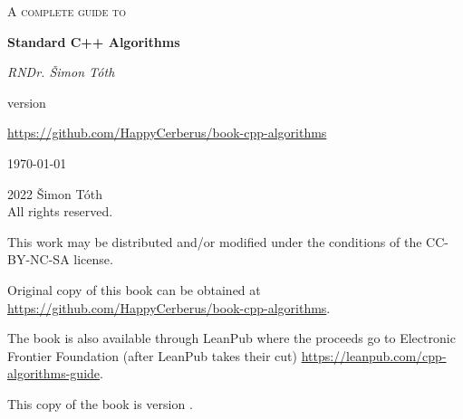 \begin{titlepage}
	\centering
	\vspace{2cm}
	{\scshape\huge A complete guide to\par}
	\vspace{1.5cm}
	{\huge\bfseries Standard C++ Algorithms\par}
	\vspace{2cm}
	{\Large\itshape RNDr. Šimon Tóth\par}
	\vfill
	version \version\par
	\href{https://github.com/HappyCerberus/book-cpp-algorithms}{https://github.com/HappyCerberus/book-cpp-algorithms}

	\vfill

	{\large \today\par}
\end{titlepage}

\pagestyle{empty}
\begingroup
\footnotesize
\parindent 0pt
\parskip \baselineskip
\vfill
\textcopyright{} 2022 Šimon Tóth \\
All rights reserved.

This work may be distributed and/or modified under the conditions of the CC-BY-NC-SA license.

Original copy of this book can be obtained at \href{https://github.com/HappyCerberus/book-cpp-algorithms}{https://github.com/HappyCerberus/book-cpp-algorithms}.

The book is also available through LeanPub where the proceeds go to Electronic Frontier Foundation (after LeanPub takes their cut) \href{https://leanpub.com/cpp-algorithms-guide}{https://leanpub.com/cpp-algorithms-guide}.

This copy of the book is version \version.

\vfill

\vspace*{2\baselineskip}


\endgroup
\clearpage
\pagestyle{plain}